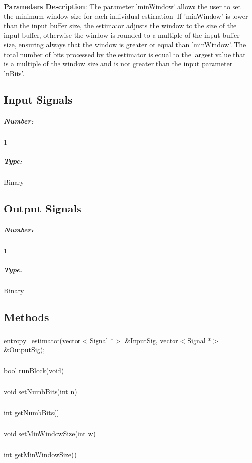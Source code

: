 \paragraph{}
\textbf{Parameters Description}: The parameter 'minWindow' allows the user to set the 
minimum window size for each individual estimation. If 'minWindow' is lower than the 
input buffer size, the estimator adjusts the window to the size of the input buffer, 
otherwise the window is rounded to a multiple of the input buffer size, ensuring always 
that the window is greater or equal than 'minWindow'. The total number of bits processed 
by the estimator is equal to the largest value that is a multiple of the window size and 
is not greater than the input parameter 'nBits'.

\subsection*{Input Signals}
\subparagraph*{Number:} 1
\subparagraph*{Type:} Binary

\subsection*{Output Signals}
\subparagraph*{Number:} 1
\subparagraph*{Type:} Binary
\paragraph{}

\subsection*{Methods}
\subparagraph*{}
entropy\_estimator(vector$<$Signal *$>$ \&InputSig, vector$<$Signal *$>$ \&OutputSig);
\subparagraph*{}
bool runBlock(void)
\subparagraph*{}
void setNumbBits(int n)
\subparagraph*{}
int getNumbBits()
\subparagraph*{}
void setMinWindowSize(int w)
\subparagraph*{}
int getMinWindowSize()






